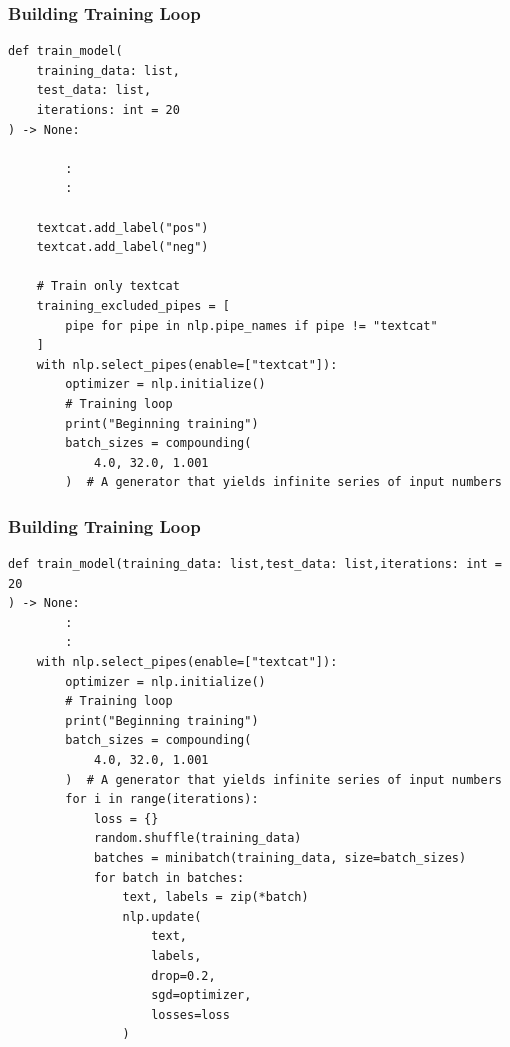 \begin{frame}[fragile]\frametitle{Building Training Loop }

\begin{lstlisting}
def train_model(
    training_data: list,
    test_data: list,
    iterations: int = 20
) -> None:

		:
		:

    textcat.add_label("pos")
    textcat.add_label("neg")			
		
    # Train only textcat
    training_excluded_pipes = [
        pipe for pipe in nlp.pipe_names if pipe != "textcat"
    ]		
    with nlp.select_pipes(enable=["textcat"]):
        optimizer = nlp.initialize()
        # Training loop
        print("Beginning training")
        batch_sizes = compounding(
            4.0, 32.0, 1.001
        )  # A generator that yields infinite series of input numbers
\end{lstlisting}

\end{frame}

\begin{frame}[fragile]\frametitle{Building Training Loop }

\begin{lstlisting}
def train_model(training_data: list,test_data: list,iterations: int = 20
) -> None:
		:
		:
    with nlp.select_pipes(enable=["textcat"]):
        optimizer = nlp.initialize()
        # Training loop
        print("Beginning training")
        batch_sizes = compounding(
            4.0, 32.0, 1.001
        )  # A generator that yields infinite series of input numbers		
        for i in range(iterations):
            loss = {}
            random.shuffle(training_data)
            batches = minibatch(training_data, size=batch_sizes)
            for batch in batches:
                text, labels = zip(*batch)
                nlp.update(
                    text,
                    labels,
                    drop=0.2,
                    sgd=optimizer,
                    losses=loss
                )				
\end{lstlisting}

\end{frame}


